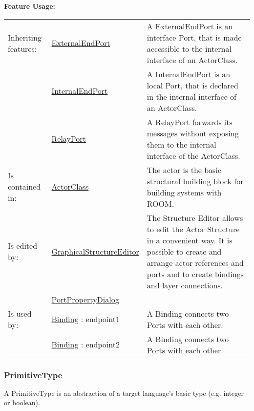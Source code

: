		\begingroup
		\textbf{Feature Usage:}
		\renewcommand{\arraystretch}{1.8} %
		\begin{longtable}{l|l p{}}
			\hline
		Inheriting features: & \tabitem \hyperlink{ref:ExternalEndPort}{ExternalEndPort}  & A ExternalEndPort is an interface Port, that is made accessible to the internal interface of an ActorClass.\\
		& \tabitem \hyperlink{ref:InternalEndPort}{InternalEndPort}  & A InternalEndPort is an local Port, that is declared in the internal interface of an ActorClass. \\
		& \tabitem \hyperlink{ref:RelayPort}{RelayPort}  & A RelayPort forwards its messages without exposing them to the internal interface of the ActorClass. \\
		\hline
		Is contained in: & \tabitem \hyperlink{ref:ActorClass}{ActorClass}  & The actor is the basic structural building block for building systems with ROOM.\\
		\hline
		Is edited by: & \tabitem \hyperlink{ref:GraphicalStructureEditor}{GraphicalStructureEditor}  & The Structure Editor allows to edit the Actor Structure in a convenient way. It is possible to create and arrange actor references and ports and to create bindings and layer connections.\\
		& \tabitem \hyperlink{ref:PortPropertyDialog}{PortPropertyDialog}  &  \\
		\hline
		Is used by: & \tabitem \hyperlink{ref:Binding}{Binding} : endpoint1 & A Binding connects two Ports with each other.\\
		& \tabitem \hyperlink{ref:Binding}{Binding} : endpoint2 & A Binding connects two Ports with each other. \\
		\hline
		\end{longtable}
		\endgroup
		
		
	\vspace{\baselineskip}
	\vspace{\baselineskip}
	\vspace{\baselineskip}
	
	\subsubsection{PrimitiveType}
		\hypertarget{ref:PrimitiveType}{}
		
		A PrimitiveType is an abstraction of a target language's basic type (e.g. integer or boolean).
		
